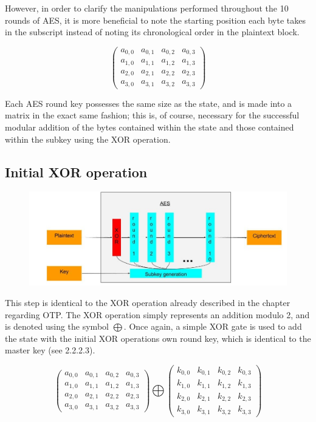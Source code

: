 \documentclass[12pt]{report}
\theoremstyle{definition}
\theoremstyle{remark}
\begin{document}
However, in order to clarify the manipulations performed throughout the 10 rounds of AES, it is more beneficial to note the starting position each byte takes in the subscript instead of noting its chronological order in the plaintext block.

\[ \left( \begin{array}{cccc}
a_{0,0} & a_{0,1} & a_{0,2} & a_{0,3} \\
a_{1,0} & a_{1,1} & a_{1,2} & a_{1,3} \\
a_{2,0} & a_{2,1} & a_{2,2} & a_{2,3} \\
a_{3,0} & a_{3,1} & a_{3,2} & a_{3,3}\end{array} \right)\] 

Each AES round key possesses the same size as the state, and is made into a matrix in the exact same fashion; this is, of course, necessary for the successful modular addition of the bytes contained within the state and those contained within the subkey using the XOR operation.


\subsection{Initial XOR operation}

\begin{figure}[H]
\centering
\includegraphics[scale=0.4]{AES_fig2.jpg}
\end{figure}

This step is identical to the XOR operation already described in the chapter regarding OTP. The XOR operation simply represents an addition modulo 2, and is denoted using the symbol $\bigoplus$. Once again, a simple XOR gate is used to add the state with the initial XOR operations own round key, which is identical to the master key (see 2.2.2.3).

\[ 
\left( \begin{array}{cccc}
a_{0,0} & a_{0,1} & a_{0,2} & a_{0,3} \\
a_{1,0} & a_{1,1} & a_{1,2} & a_{1,3} \\
a_{2,0} & a_{2,1} & a_{2,2} & a_{2,3} \\
a_{3,0} & a_{3,1} & a_{3,2} & a_{3,3}\end{array} \right)
\bigoplus
\left( \begin{array}{cccc}
k_{0,0} & k_{0,1} & k_{0,2} & k_{0,3} \\
k_{1,0} & k_{1,1} & k_{1,2} & k_{1,3} \\
k_{2,0} & k_{2,1} & k_{2,2} & k_{2,3} \\
k_{3,0} & k_{3,1} & k_{3,2} & k_{3,3}\end{array} \right)
\]
\end{document}
